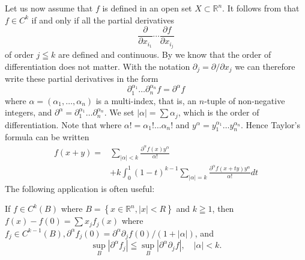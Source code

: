 Let us now assume that $f$ is defined in an open set $X \subset \mathbb{R}^{n}$. It follows from  that $f \in C^{k}$ if and only if all the partial derivatives
\[
	\frac{\partial}{\partial x_{i_{1}}} \cdots \frac{\partial f}{\partial x_{i_{j}}}
\]
of order $j \leqq k$ are defined and continuous. By  we know that the order of differentiation does not matter. With the notation $\partial_{j}=\partial / \partial x_{j}$ we can therefore write these partial derivatives in the form
\[
	\partial_{1}^{\alpha_{1}} \ldots \partial_{n}^{\alpha_{n}} f=\partial^{\alpha} f
\]
where $\alpha=\left(\alpha_{1}, \ldots, \alpha_{n}\right)$ is a multi-index, that is, an $n$-tuple of non-negative integers, and $\partial^{\alpha}=\partial_{1}^{\alpha_{1}} \ldots \partial_{n}^{\alpha_{n}}$. We set $|\alpha|=\sum \alpha_{j}$, which is the order of differentiation. Note that where $\alpha !=\alpha_{1} ! \ldots \alpha_{n} !$ and $y^{\alpha}=y_{1}^{\alpha_{1}} \ldots y_{n}^{\alpha_{n}}$. Hence Taylor's formula can be written
	\begin{align}
        \label{(1.1.7)'}
		f(x+y)= & \sum_{|\alpha|<k} \frac{\partial^{\alpha} f(x) y^{\alpha}}{\alpha !}                                    \\
		        & +k \int_{0}^{1}(1-t)^{k-1} \sum_{|\alpha|=k} \frac{\partial^{\alpha} f(x+t y) y^{\alpha}}{\alpha !} d t
	\end{align}
The following application is often useful:
\begin{theorem}
    If $f \in C^{k}(B)$ where $B=\left\{x \in \mathbb{R}^{n},|x|<R\right\}$ and $k \geqq 1$, then $f(x)-f(0)=\sum x_{j} f_{j}(x)$ where $f_{j} \in C^{k-1}(B), \partial^{\alpha} f_{j}(0)=\partial^{\alpha} \partial_{j} f(0) /(1+|\alpha|)$, and
\begin{equation}
    \label{(1.1.9)}
	\sup _{B}\left|\partial^{\alpha} f_{j}\right| \leqq \sup _{B}\left|\partial^{\alpha} \partial_{j} f\right|, \quad|\alpha|<k . 
\end{equation}
\end{theorem}
